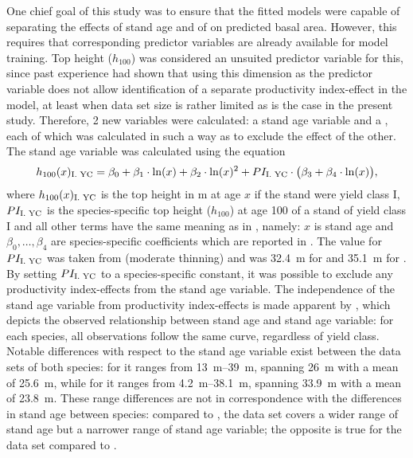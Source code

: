 One chief goal of this study was to ensure that the fitted models were capable of separating the effects of stand age and of \ProductivityIndexText{} on predicted basal area.  However, this requires that corresponding predictor variables are already available for model training.  Top height (\(h_{100}\)) was considered an unsuited predictor variable for this, since past experience had shown that using this dimension as the predictor variable does not allow identification of a separate productivity index-effect in the model, at least when data set size is rather limited as is the case in the present study.  Therefore, 2 new variables were calculated:  a stand age variable and a \ProductivityIndexVariableText{}, each of which was calculated in such a way as to exclude the effect of the other. The stand age variable was calculated using the equation
\begin{equation}
  \label{eq:StandAgeVariable}
  h_{100}(x)_{\text{I. YC}}{} = \beta_0 + \beta_1 \cdot \ln(x) + \beta_2 \cdot \ln(x)^2 + PI_{\text{I. YC}}{} \cdot \bigl(\beta_3 + \beta_4 \cdot \ln(x)\bigr),
\end{equation}
where \(h_{100}(x)_{\text{I. YC}}{}\) is the top height in \si{\meter} at age \(x\) if the stand were yield class I, \(PI_{\text{I. YC}}{}\) is the species-specific top height (\(h_{100}\)) at age \SI{100}{\year} of a stand of yield class I and all other terms have the same meaning as in , namely: \(x\) is stand age and \(\beta_0, \ldots, \beta_4\) are species-specific coefficients which are reported in  \parencite{Nagel1999}.  The value for \(PI_{\text{I. YC}}{}\) was taken from \textcite{Schober1995} (moderate thinning) and was \SI{32.4}{\meter} for \Beech{} and \SI{35.1}{\meter} for \Spruce{}.  By setting \(PI_{\text{I. YC}}{}\) to a species-specific constant, it was possible to exclude any productivity index-effects from the stand age variable.  The independence of the stand age variable from productivity index-effects is made apparent by , which depicts the observed relationship between stand age and stand age variable:  for each species, all observations follow the same curve, regardless of yield class.  Notable differences with respect to the stand age variable exist between the data sets of both species:  for \Beech{} it ranges from \SIrange{13}{39}{\meter}, spanning \SI{26}{\meter} with a mean of \SI{25.6}{\meter}, while for \Spruce{} it ranges from \SIrange{4.2}{38.1}{\meter}, spanning \SI{33.9}{\meter} with a mean of \SI{23.8}{\meter}.  These range differences are not in correspondence with the differences in stand age between species:  compared to \Spruce{}, the \Beech{} data set covers a wider range of stand age but a narrower range of stand age variable;  the opposite is true for the \Spruce{} data set compared to \Beech{}.

